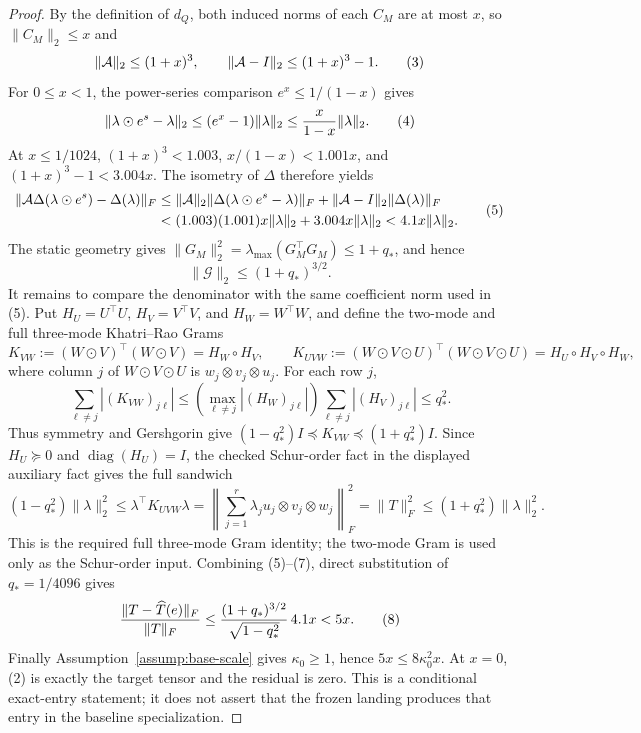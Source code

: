 \begin{lemma}
\begin{proof}
By the definition of \(d_Q\), both induced norms of each \(C_M\) are at most
\(x\), so \(\|C_M\|_2\le x\) and
\[
 \|{\cal A}\|_2\le(1+x)^3,\qquad
 \|{\cal A}-I\|_2\le(1+x)^3-1.
\tag{3}
\]
For \(0\le x<1\), the power-series comparison \(e^x\le1/(1-x)\) gives
\[
 \|\lambda\odot e^s-\lambda\|_2
 \le(e^x-1)\|\lambda\|_2
 \le {x\over1-x}\|\lambda\|_2.
\tag{4}
\]
At \(x\le1/1024\), \((1+x)^3<1.003\),
\(x/(1-x)<1.001x\), and \((1+x)^3-1<3.004x\). The isometry of \(\Delta\)
therefore yields
\[
\begin{aligned}
 \|{\cal A}\Delta(\lambda\odot e^s)-\Delta(\lambda)\|_F
 &\le\|{\cal A}\|_2\|\Delta(\lambda\odot e^s-\lambda)\|_F
  +\|{\cal A}-I\|_2\|\Delta(\lambda)\|_F\\
 &<(1.003)(1.001)x\|\lambda\|_2+3.004x\|\lambda\|_2
 <4.1x\|\lambda\|_2.
\end{aligned}
\tag{5}
\]
The static geometry gives
\(\|G_M\|_2^2=\lambda_{\max}(G_M^\top G_M)\le1+q_*\), and hence
\[
 \|{\mathscr G}\|_2\le(1+q_*)^{3/2}.
\tag{6}
\]
It remains to compare the denominator with the same coefficient norm used in
(5).  Put \(H_U=U^\top U\), \(H_V=V^\top V\), and \(H_W=W^\top W\), and
define the two-mode and full three-mode Khatri--Rao Grams
\[
 K_{VW}:=(W\odot V)^\top(W\odot V)=H_W\circ H_V,
 \qquad
 K_{UVW}:=(W\odot V\odot U)^\top(W\odot V\odot U)
      =H_U\circ H_V\circ H_W,
\]
where column \(j\) of \(W\odot V\odot U\) is
\(w_j\otimes v_j\otimes u_j\).  For each row \(j\),
\[
 \sum_{\ell\ne j}|(K_{VW})_{j\ell}|
 \le \left(\max_{\ell\ne j}|(H_W)_{j\ell}|\right)
   \sum_{\ell\ne j}|(H_V)_{j\ell}|
 \le q_*^2.
\]
Thus symmetry and Gershgorin give
\((1-q_*^2)I\preceq K_{VW}\preceq(1+q_*^2)I\).  Since
\(H_U\succeq0\) and \(\operatorname{diag}(H_U)=I\), the checked Schur-order
fact in the displayed auxiliary fact gives the full sandwich
\[
 (1-q_*^2)\|\lambda\|_2^2
 \le \lambda^\top K_{UVW}\lambda
 =\left\|\sum_{j=1}^r\lambda_j
    u_j\otimes v_j\otimes w_j\right\|_F^2
 =\|T\|_F^2
 \le(1+q_*^2)\|\lambda\|_2^2.
\tag{7}
\]
This is the required full three-mode Gram identity; the two-mode Gram is used
only as the Schur-order input.
Combining (5)--(7), direct substitution of \(q_*=1/4096\) gives
\[
 { \|T-\widehat T(e)\|_F\over\|T\|_F}
 \le { (1+q_*)^{3/2}\over\sqrt{1-q_*^2}}\,4.1x
 <5x.
\tag{8}
\]
Finally Assumption~\ref{assump:base-scale} gives \(\kappa_0\ge1\), hence
\(5x\le8\kappa_0^2x\).  At \(x=0\), (2) is exactly the target tensor and
the residual is zero.  This is a conditional exact-entry statement; it does
not assert that the frozen landing produces that entry in the baseline
specialization.



\end{proof}
\end{lemma}
